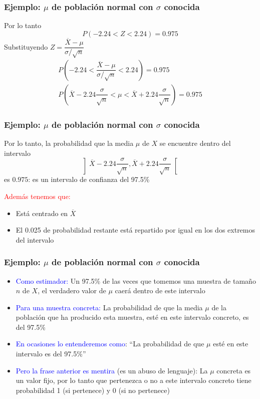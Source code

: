 \documentclass[12pt,t]{beamer}
\newcommand{\red}[1]{\textcolor{red}{#1}}
\newcommand{\blue}[1]{\textcolor{blue}{#1}}
\renewcommand{\emph}[1]{{\color{red}#1}}
\theoremstyle{plain}
\theoremstyle{definition}
\begin{document}
\begin{frame}
\frametitle{Ejemplo: $\mu$ de población normal con $\sigma$ conocida}
Por lo tanto
$$
P(-2.24<Z<2.24)=0.975
$$
Substituyendo $Z=\dfrac{\overline{X}-\mu}{\sigma/\sqrt{n}}$
$$
\begin{array}{c}
P\left(-2.24<\dfrac{\overline{X}-\mu}{\sigma/\sqrt{n}}
<2.24\right)=0.975\\[3ex]
P\left(\overline{X} -2.24 \dfrac{\sigma}{\sqrt{n}}< \mu< \overline{X}+
2.24\dfrac{\sigma}{\sqrt{n}}\right)=0.975
\end{array}
$$
\end{frame}

\begin{frame}
\frametitle{Ejemplo: $\mu$ de población normal con $\sigma$ conocida}
Por  lo tanto, la probabilidad que la media  $\mu$ de $X$ 
se encuentre dentro del intervalo
$$
\left]\overline{X} -2.24 \frac{\sigma}{\sqrt{n}},
\overline{X}+ 2.24\frac{\sigma}{\sqrt{n}}
\right[
$$
es $0.975$: es un intervalo de confianza  del 97.5\%
\medskip

\red{Además tenemos que:}
\begin{itemize}
\item Está centrado en $\overline{X}$
\medskip

\item El 0.025 de probabilidad restante  está repartido por igual en los dos extremos del intervalo
\end{itemize}
\end{frame}

\begin{frame}
\frametitle{Ejemplo: $\mu$ de población normal con $\sigma$ conocida}


\begin{itemize}
\item \blue{Como  estimador:} Un 97.5\% de las veces  que tomemos una muestra de tamaño $n$ de $X$, el verdadero valor de $\mu$ caerá dentro de este intervalo 
\medskip

\item \blue{Para una muestra concreta:} La probabilidad de que la media  $\mu$ de la población que ha producido esta muestra, esté en este intervalo concreto, es del 97.5\%
\medskip

\item \blue{En ocasiones lo entenderemos como}:  ``La probabilidad de que $\mu$ esté en este intervalo es del 97.5\%''
\medskip

\item \blue{Pero la frase anterior es mentira} (\emph{es un abuso de lenguaje}): La $\mu$ concreta es un valor fijo, por lo  tanto  que pertenezca o   no a este intervalo concreto tiene probabilidad 1 (si   pertenece) y 0 (si no  pertenece) 
\end{itemize}


\end{frame}
\end{document}
